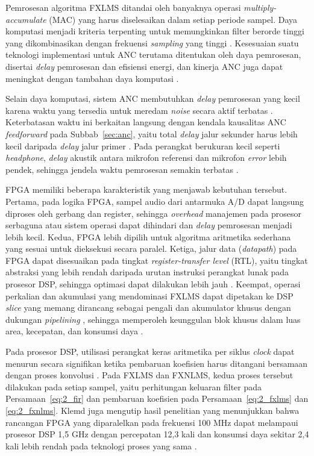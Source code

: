 Pemrosesan algoritma FXLMS ditandai oleh banyaknya operasi \emph{multiply-accumulate} (MAC) yang harus diselesaikan dalam setiap periode sampel. Daya komputasi menjadi kriteria terpenting untuk memungkinkan filter berorde tinggi yang dikombinasikan dengan frekuensi \emph{sampling} yang tinggi \parencite{klemd2023}. Kesesuaian suatu teknologi implementasi untuk ANC terutama ditentukan oleh daya pemrosesan, disertai \emph{delay} pemrosesan dan efisiensi energi, dan kinerja ANC juga dapat meningkat dengan tambahan daya komputasi \parencite{klemd2023}.

Selain daya komputasi, sistem ANC membutuhkan \emph{delay} pemrosesan yang kecil karena waktu yang tersedia untuk meredam \emph{noise} secara aktif terbatas \parencite{klemd2023}. Keterbatasan waktu ini berkaitan langsung dengan kendala kausalitas ANC \emph{feedforward} pada Subbab~\ref{sec:anc}, yaitu total \emph{delay} jalur sekunder harus lebih kecil daripada \emph{delay} jalur primer \parencite{zhangqiu2014}. Pada perangkat berukuran kecil seperti \emph{headphone}, \emph{delay} akustik antara mikrofon referensi dan mikrofon \emph{error} lebih pendek, sehingga jendela waktu pemrosesan semakin terbatas \parencite{shi2023anc}.

FPGA memiliki beberapa karakteristik yang menjawab kebutuhan tersebut. Pertama, pada logika FPGA, sampel audio dari antarmuka A/D dapat langsung diproses oleh gerbang dan register, sehingga \emph{overhead} manajemen pada prosesor serbaguna atau sistem operasi dapat dihindari dan \emph{delay} pemrosesan menjadi lebih kecil. Kedua, FPGA lebih dipilih untuk algoritma aritmetika sederhana yang sesuai untuk dieksekusi secara paralel. Ketiga, jalur data (\emph{datapath}) pada FPGA dapat disesuaikan pada tingkat \emph{register-transfer level} (RTL), yaitu tingkat abstraksi yang lebih rendah daripada urutan instruksi perangkat lunak pada prosesor DSP, sehingga optimasi dapat dilakukan lebih jauh \parencite{klemd2023}. Keempat, operasi perkalian dan akumulasi yang mendominasi FXLMS dapat dipetakan ke DSP \emph{slice} yang memang dirancang sebagai pengali dan akumulator khusus dengan dukungan \emph{pipelining} \parencite{amd_ds180}, sehingga memperoleh keunggulan blok khusus dalam luas area, kecepatan, dan konsumsi daya \parencite{boutros2021}.

Pada prosesor DSP, utilisasi perangkat keras aritmetika per siklus \emph{clock} dapat menurun secara signifikan ketika pembaruan koefisien harus ditangani bersamaan dengan proses konvolusi \parencite{klemd2023}. Pada FXLMS dan FXNLMS, kedua proses tersebut dilakukan pada setiap sampel, yaitu perhitungan keluaran filter pada Persamaan~\eqref{eq:2_fir} dan pembaruan koefisien pada Persamaan~\eqref{eq:2_fxlms} dan \eqref{eq:2_fxnlms}. Klemd juga mengutip hasil penelitian yang menunjukkan bahwa rancangan FPGA yang diparalelkan pada frekuensi 100 MHz dapat melampaui prosesor DSP 1,5 GHz dengan percepatan 12,3 kali dan konsumsi daya sekitar 2,4 kali lebih rendah pada teknologi proses yang sama \parencite{klemd2023}.

